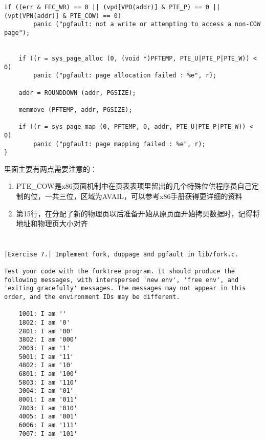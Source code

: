 \documentclass{article}
\begin{document}
\begin{CJK*}{UTF8}{gkai}
\begin{lstlisting}[style=ccode, title={\scriptsize \ttfamily \bfseries lib/pgfault.c}]
    if ((err & FEC_WR) == 0 || (vpd[VPD(addr)] & PTE_P) == 0 ||  (vpt[VPN(addr)] & PTE_COW) == 0)
        panic ("pgfault: not a write or attempting to access a non-COW page");


    if ((r = sys_page_alloc (0, (void *)PFTEMP, PTE_U|PTE_P|PTE_W)) < 0)
        panic ("pgfault: page allocation failed : %e", r);

    addr = ROUNDDOWN (addr, PGSIZE);

    memmove (PFTEMP, addr, PGSIZE);

    if ((r = sys_page_map (0, PFTEMP, 0, addr, PTE_U|PTE_P|PTE_W)) < 0)
        panic ("pgfault: page mapping failed : %e", r);
}
\end{lstlisting}

里面主要有两点需要注意的：

\begin{enumerate}
\item{PTE\_COW是x86页面机制中在页表表项里留出的几个特殊位供程序员自己定制的位，一共三位，区域为AVAIL，可以参考x86手册获得更详细的资料}
\item{第15行，在分配了新的物理页以后准备开始从原页面开始拷贝数据时，记得将地址和物理页大小对齐}
\end{enumerate}


\begin{lstlisting}[style=acode, title={\scriptsize \ttfamily \bfseries kern/trapentry.S}]
\end{lstlisting}

\begin{lstlisting}[style=acode, title={\scriptsize \ttfamily \bfseries kern/trapentry.S}]
\end{lstlisting}

\begin{lstlisting}[style=exercise]
|Exercise 7.| Implement fork, duppage and pgfault in lib/fork.c.

Test your code with the forktree program. It should produce the following messages, with interspersed 'new env', 'free env', and 'exiting gracefully' messages. The messages may not appear in this order, and the environment IDs may be different.

	1001: I am ''
	1802: I am '0'
	2801: I am '00'
	3802: I am '000'
	2003: I am '1'
	5001: I am '11'
	4802: I am '10'
	6801: I am '100'
	5803: I am '110'
	3004: I am '01'
	8001: I am '011'
	7803: I am '010'
	4005: I am '001'
	6006: I am '111'
	7007: I am '101'
\end{lstlisting}


\begin{lstlisting}[style=console]
\end{lstlisting}


\end{CJK*}
\end{document}
